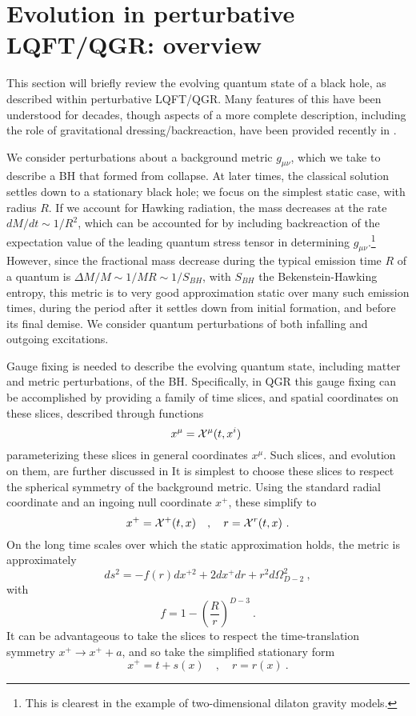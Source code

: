 \documentclass[12pt]{article}
\numberwithin{equation}{section}
\newcommand{\calx}{{\cal X}}
\newcommand{\beq}{\begin{equation}}
\newcommand{\eeq}{\end{equation}}
\begin{document}
\section{Evolution in perturbative LQFT/QGR: overview}
\label{QFTsec}


This section will briefly review the  evolving quantum state of a black hole, as described within perturbative LQFT/QGR.  Many features of this have been understood for decades, though aspects of a more complete description, including the role of gravitational dressing/backreaction, have been provided recently in \cite{GiPe1,GiPe2}.

We consider perturbations about a background metric $g_{\mu\nu}$, which we take to describe a BH that formed from collapse.  At later times, the classical solution settles down to a stationary black hole; we focus on the simplest  static case, with radius $R$. If we account for Hawking radiation, the mass decreases at the rate $dM/dt \sim 1/R^2$, which can be accounted for by including backreaction of the expectation value of the leading quantum stress tensor in determining $g_{\mu\nu}$.\footnote{This is clearest in the example of two-dimensional dilaton gravity models\cite{CGHS,SGTrieste}.}  
However, since the fractional mass decrease during the typical emission time $R$ of a quantum is $\Delta M/M\sim 1/MR\sim 1/S_{BH}$, with $S_{BH}$ the Bekenstein-Hawking entropy, this metric is to very good approximation static over many such emission times, during the period after it settles down from initial formation, and before its final demise.  
We consider quantum perturbations of both infalling and outgoing excitations.
%

Gauge fixing is needed to describe the evolving quantum state, including  matter and metric perturbations, of the BH.  Specifically, in QGR this gauge fixing can be accomplished by providing a family of time slices, and spatial coordinates on these slices, described through functions
\beq\label{slices}
x^\mu =\calx^\mu(t, x^i)\ 
\eeq
parameterizing these slices in general coordinates $x^\mu$.  Such slices, and evolution on them, are further discussed in \cite{SEHS,SE2d,GiPe1}
It is simplest to choose these slices to respect the spherical symmetry of the background metric.  Using the standard radial coordinate and an ingoing null coordinate $x^+$, these simplify to
\beq\label{radslices}
x^+=\calx^+(t,x)\quad ,\quad r=\calx^r(t,x)\ .
\eeq
On the long time scales over which the static approximation holds, the metric is approximately
\beq\label{Schw}
ds^2=-f(r) dx^{+2} + 2 dx^+ dr + r^2 d\Omega_{D-2}^2\ ,
\eeq
with
\beq
f= 1-\left(\frac{R}{r}\right)^{D-3}\ .
\eeq
It can be advantageous to take the slices to respect the time-translation symmetry $x^+\rightarrow x^+ + a$, and so take the simplified stationary 
form\cite{NVU,SEHS,GiPe1}
\beq\label{statslices}
x^+= t+s(x)\quad,\quad r=r(x)\ .
\eeq
\end{document}
